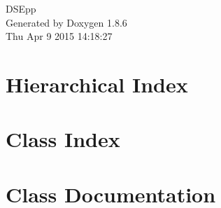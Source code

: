 \documentclass[twoside]{book}
\newcommand{\clearemptydoublepage}{%
  \newpage{\pagestyle{empty}\cleardoublepage}%
}
\begin{document}
\hypersetup{pageanchor=false}
\begin{titlepage}
\vspace*{7cm}
\begin{center}%
{\Large D\-S\-Epp }\\
\vspace*{1cm}
{\large Generated by Doxygen 1.8.6}\\
\vspace*{0.5cm}
{\small Thu Apr 9 2015 14:18:27}\\
\end{center}
\end{titlepage}
\clearemptydoublepage
\tableofcontents
\clearemptydoublepage
{}
\hypersetup{pageanchor=true}

\chapter{Hierarchical Index}

\chapter{Class Index}

\chapter{Class Documentation}




















































\newpage
{}
{}
\printindex
\end{document}
